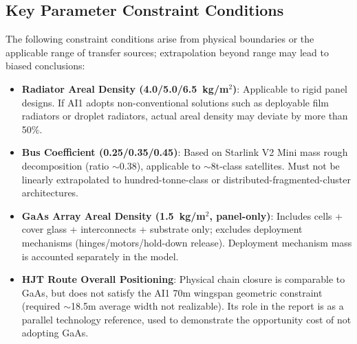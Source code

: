 \subsection{Key Parameter Constraint Conditions}
\label{sec:param-constraints}

The following constraint conditions arise from physical boundaries or the applicable range of transfer sources; extrapolation beyond range may lead to biased conclusions:

\begin{itemize}
  \item \textbf{Radiator Areal Density (4.0/5.0/6.5~kg/m$^2$)}: Applicable to rigid panel designs. If AI1 adopts non-conventional solutions such as deployable film radiators or droplet radiators, actual areal density may deviate by more than 50\%.

  \item \textbf{Bus Coefficient (0.25/0.35/0.45)}: Based on Starlink V2 Mini mass rough decomposition (ratio $\sim$0.38), applicable to $\sim$8t-class satellites. Must not be linearly extrapolated to hundred-tonne-class or distributed-fragmented-cluster architectures.

  \item \textbf{GaAs Array Areal Density (1.5~kg/m$^2$, panel-only)}: Includes cells + cover glass + interconnects + substrate only; excludes deployment mechanisms (hinges/motors/hold-down release). Deployment mechanism mass is accounted separately in the model.

  \item \textbf{HJT Route Overall Positioning}: Physical chain closure is comparable to GaAs, but does not satisfy the AI1 70m wingspan geometric constraint (required $\sim$18.5m average width not realizable). Its role in the report is as a parallel technology reference, used to demonstrate the opportunity cost of not adopting GaAs.
\end{itemize}
